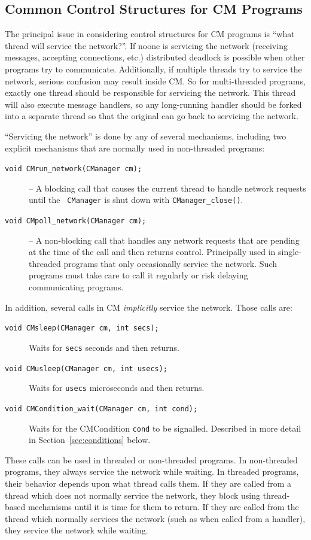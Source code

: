\documentclass[11pt]{article}
\begin{document}
\subsection{Common Control Structures for CM Programs}

The principal issue in considering control structures for CM programs is
``what thread will service the network?''.  If noone is servicing the
network (receiving messages, accepting connections, etc.) distributed
deadlock is possible when other programs try to communicate.  Additionally,
if multiple threads try to service the network, serious confusion may result
inside CM.  So for multi-threaded programs, exactly one thread should be
responsible for servicing the network.  This thread will also execute
message handlers, so any long-running handler should be forked into a
separate thread so that the original can go back to servicing the network.

``Servicing the network'' is done by any of several mechanisms, including
two explicit mechanisms that are normally used in non-threaded programs: 
\begin{description}
\item[{\tt void CMrun\_network(CManager cm);}]  -- A blocking call that
causes the current thread to handle network requests until the {\tt
CManager} is shut down with {\tt CManager\_close()}.  
\item[{\tt void CMpoll\_network(CManager cm);}] -- A non-blocking call that
handles any network requests that are pending at the time of the call and
then returns control.  Principally used in single-threaded programs that
only occasionally service the network.  Such programs must take care to call
it regularly or risk delaying communicating programs.
\end{description}

In addition, several calls in CM {\it implicitly} service the network.
Those calls are:
\begin{description}
\item[{\tt void CMsleep(CManager cm, int secs);}]  Waits for {\tt secs}
seconds and then returns.
\item[{\tt void CMusleep(CManager cm, int usecs);}]  Waits for {\tt usecs}
microseconds and then returns.
\item[{\tt void CMCondition\_wait(CManager cm, int cond);}]  Waits for the
CMCondition {\tt cond} to be signalled.  Described in more detail in
Section~\ref{sec:conditions} below.
\end{description}
These calls can be used in threaded or non-threaded programs.  In
non-threaded programs, they always service the network while waiting.  In
threaded programs, their behavior depends upon what thread calls them.  If
they are called from a thread which does not normally service the network,
they block using thread-based mechanisms until it is time for them to
return.  If they are called from the thread which normally services the
network (such as when called from a handler), they service the network while
waiting.  
\end{document}
